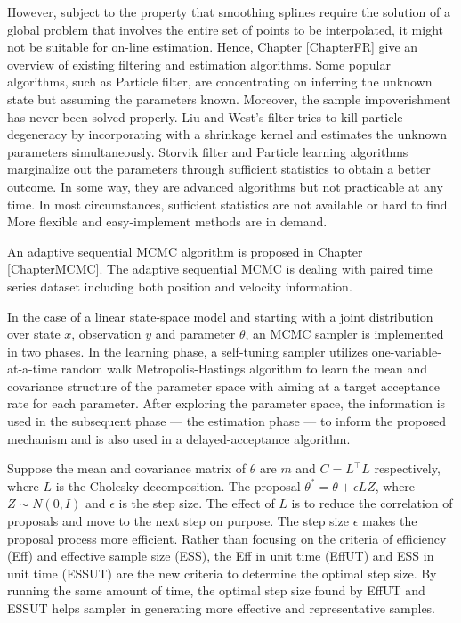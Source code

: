 However, subject to the property that smoothing splines require the solution of a global problem that involves the entire set of points to be interpolated, it might not be suitable for on-line estimation. Hence, Chapter \ref{ChapterFR} give an overview of existing filtering and estimation algorithms. Some popular algorithms, such as Particle filter, are concentrating on inferring the unknown state but assuming the parameters known. Moreover, the sample impoverishment has never been solved properly. Liu and West's filter tries to kill particle degeneracy by incorporating with a shrinkage kernel and estimates the unknown parameters simultaneously. Storvik filter and Particle learning algorithms marginalize out the parameters through sufficient statistics to obtain a better outcome. In some way, they are advanced algorithms but not practicable at any time. In most circumstances, sufficient statistics are not available or hard to find. More flexible and easy-implement methods are in demand. 
 
An adaptive sequential MCMC algorithm is proposed in Chapter \ref{ChapterMCMC}. The adaptive sequential MCMC is dealing with paired time series dataset including both position and velocity information. 

In the case of a linear state-space model and starting with a joint distribution over state $x$, observation $y$ and parameter $\theta$, an MCMC sampler is implemented in two phases. In the learning phase, a self-tuning sampler utilizes one-variable-at-a-time random walk Metropolis-Hastings algorithm to learn the mean and covariance structure of the parameter space with aiming at a target acceptance rate for each parameter. After exploring the parameter space, the information is used in the subsequent phase --- the estimation phase --- to inform the proposed mechanism and is also used in a delayed-acceptance algorithm. 

Suppose the mean and covariance matrix of $\theta$ are $m$ and $C=L^\top L$ respectively, where $L$ is the Cholesky decomposition. The proposal $\theta^*=\theta + \epsilon LZ$, where $Z\sim N(0,I)$ and $\epsilon$ is the step size. The effect of $L$ is to reduce the correlation of proposals and move to the next step on purpose. The step size $\epsilon$ makes the proposal process more efficient. Rather than focusing on the criteria of efficiency (Eff) and effective sample size (ESS), the Eff in unit time (EffUT) and ESS in unit time (ESSUT) are the new criteria to determine the optimal step size. By running the same amount of time, the optimal step size found by EffUT and ESSUT helps sampler in generating more effective and representative samples. 

